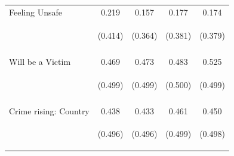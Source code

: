 \begin{center}
\begin{tabular}{lcccc}
\noalign{\smallskip}Feeling Unsafe & 0.219 & 0.157 & 0.177 & 0.174\\
 & \begin{footnotesize}(0.414)\end{footnotesize} & \begin{footnotesize}(0.364)\end{footnotesize} & \begin{footnotesize}(0.381)\end{footnotesize} & \begin{footnotesize}(0.379)\end{footnotesize}\\
 & \begin{footnotesize}\end{footnotesize} & \begin{footnotesize}\end{footnotesize} & \begin{footnotesize}\end{footnotesize} & \begin{footnotesize}\end{footnotesize}\\
\noalign{\smallskip}Will be a Victim & 0.469 & 0.473 & 0.483 & 0.525\\
 & \begin{footnotesize}(0.499)\end{footnotesize} & \begin{footnotesize}(0.499)\end{footnotesize} & \begin{footnotesize}(0.500)\end{footnotesize} & \begin{footnotesize}(0.499)\end{footnotesize}\\
 & \begin{footnotesize}\end{footnotesize} & \begin{footnotesize}\end{footnotesize} & \begin{footnotesize}\end{footnotesize} & \begin{footnotesize}\end{footnotesize}\\
\noalign{\smallskip}Crime rising: Country & 0.438 & 0.433 & 0.461 & 0.450\\
 & \begin{footnotesize}(0.496)\end{footnotesize} & \begin{footnotesize}(0.496)\end{footnotesize} & \begin{footnotesize}(0.499)\end{footnotesize} & \begin{footnotesize}(0.498)\end{footnotesize}\\

\end{tabular}
\end{center}
